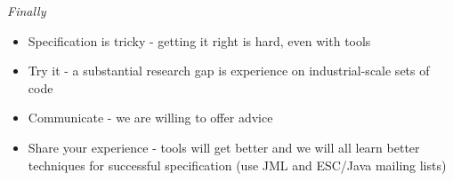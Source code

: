 \documentclass[
pdf,
nocolorBG,
slideColor,
cok,
]{prosper}
\begin{document}
\begin{slide}{\textit{Finally}}
\begin{itemize}

\item Specification is {\green tricky} - getting it right is hard, even with tools

\item {\green Try it} - a substantial research gap is experience on industrial-scale sets of code

\item {\green Communicate} - we are willing to offer advice

\item {\green Share} your experience - tools will get better and we will all learn better techniques for 
successful specification (use JML and ESC/Java mailing lists)


\end{itemize}

\end{slide}
\end{document}

